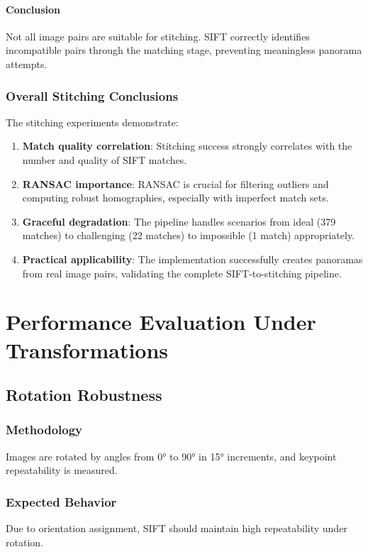 \documentclass[12pt,a4paper]{article}
\begin{document}
\paragraph{Conclusion}
Not all image pairs are suitable for stitching. SIFT correctly identifies incompatible pairs through the matching stage, preventing meaningless panorama attempts.

\subsubsection{Overall Stitching Conclusions}
The stitching experiments demonstrate:

\begin{enumerate}
    \item \textbf{Match quality correlation}: Stitching success strongly correlates with the number and quality of SIFT matches.
    
    \item \textbf{RANSAC importance}: RANSAC is crucial for filtering outliers and computing robust homographies, especially with imperfect match sets.
    
    \item \textbf{Graceful degradation}: The pipeline handles scenarios from ideal (379 matches) to challenging (22 matches) to impossible (1 match) appropriately.
    
    \item \textbf{Practical applicability}: The implementation successfully creates panoramas from real image pairs, validating the complete SIFT-to-stitching pipeline.
\end{enumerate}

\section{Performance Evaluation Under Transformations}

\subsection{Rotation Robustness}

\subsubsection{Methodology}
Images are rotated by angles from 0° to 90° in 15° increments, and keypoint repeatability is measured.

\subsubsection{Expected Behavior}
Due to orientation assignment, SIFT should maintain high repeatability under rotation.
\end{document}
